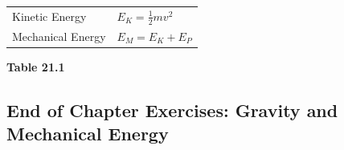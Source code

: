 {\begin{center}
\begin{xtabular*}{\mytablewidth}[t]{|p{10\mystarwidth}|p{10\mystarwidth}|}
    
        Kinetic Energy &
    
    
        
                \begin{math}{E}_{K}=\frac{1}{2}m{v}^{2}\end{math}
     \tabularnewline{}
    
    
        Mechanical Energy &
    
    
        
                \begin{math}{E}_{M}={E}_{K}+{E}_{P}\end{math}
     \tabularnewline{}
    \end{xtabular*}
      \end{center}
    \begin{center}{\small\bfseries Table 21.1}\end{center}
    
    \addtocounter{footnote}{-0}
    
        }%
      
    \par
  
      
    
    \label{m38786*cid9}
            \subsection{ End of Chapter Exercises: Gravity and Mechanical Energy}
            \nopagebreak
            
